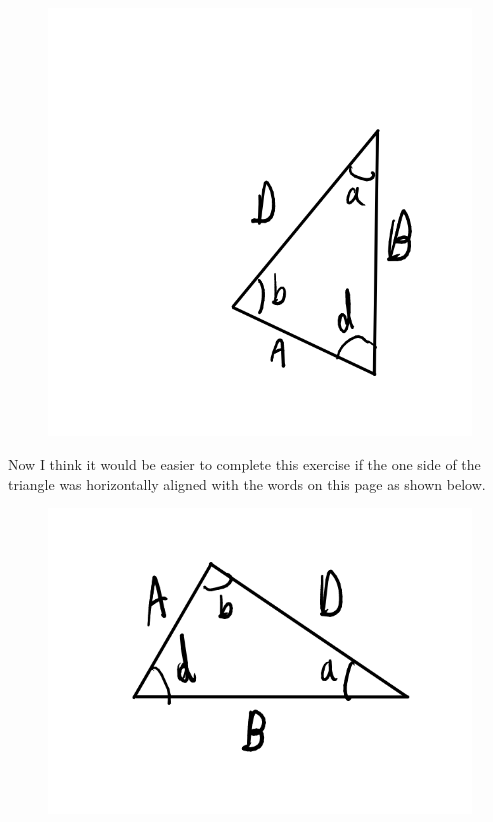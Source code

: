 \documentclass[12pt]{article}
\begin{document}
\begin{figure}[h]
\includegraphics[scale=0.25]{lawOfSin1.png}
\end{figure}

Now I think it would be easier to complete this exercise if the one side of the triangle was horizontally aligned with the words on this page as shown below.

\begin{figure}[h]
\includegraphics[scale=0.25]{lawOfSin2.png}
\end{figure}
\end{document}
